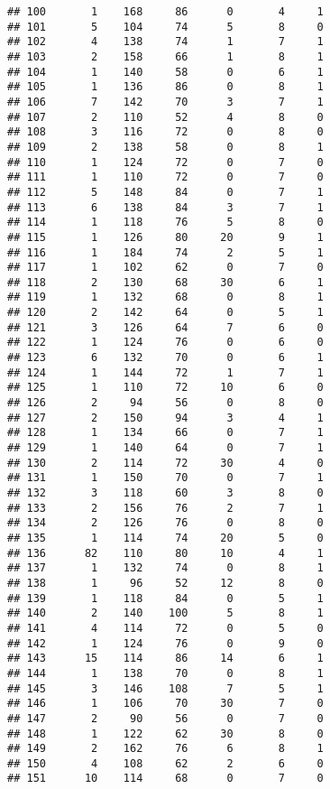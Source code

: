 \documentclass[
]{article}
\begin{document}
\begin{verbatim}
## 100       1    168     86      0       4     1
## 101       5    104     74      5       8     0
## 102       4    138     74      1       7     1
## 103       2    158     66      1       8     1
## 104       1    140     58      0       6     1
## 105       1    136     86      0       8     1
## 106       7    142     70      3       7     1
## 107       2    110     52      4       8     0
## 108       3    116     72      0       8     0
## 109       2    138     58      0       8     1
## 110       1    124     72      0       7     0
## 111       1    110     72      0       7     0
## 112       5    148     84      0       7     1
## 113       6    138     84      3       7     1
## 114       1    118     76      5       8     0
## 115       1    126     80     20       9     1
## 116       1    184     74      2       5     1
## 117       1    102     62      0       7     0
## 118       2    130     68     30       6     1
## 119       1    132     68      0       8     1
## 120       2    142     64      0       5     1
## 121       3    126     64      7       6     0
## 122       1    124     76      0       6     0
## 123       6    132     70      0       6     1
## 124       1    144     72      1       7     1
## 125       1    110     72     10       6     0
## 126       2     94     56      0       8     0
## 127       2    150     94      3       4     1
## 128       1    134     66      0       7     1
## 129       1    140     64      0       7     1
## 130       2    114     72     30       4     0
## 131       1    150     70      0       7     1
## 132       3    118     60      3       8     0
## 133       2    156     76      2       7     1
## 134       2    126     76      0       8     0
## 135       1    114     74     20       5     0
## 136      82    110     80     10       4     1
## 137       1    132     74      0       8     1
## 138       1     96     52     12       8     0
## 139       1    118     84      0       5     1
## 140       2    140    100      5       8     1
## 141       4    114     72      0       5     0
## 142       1    124     76      0       9     0
## 143      15    114     86     14       6     1
## 144       1    138     70      0       8     1
## 145       3    146    108      7       5     1
## 146       1    106     70     30       7     0
## 147       2     90     56      0       7     0
## 148       1    122     62     30       8     0
## 149       2    162     76      6       8     1
## 150       4    108     62      2       6     0
## 151      10    114     68      0       7     0

\end{verbatim}
\end{document}
